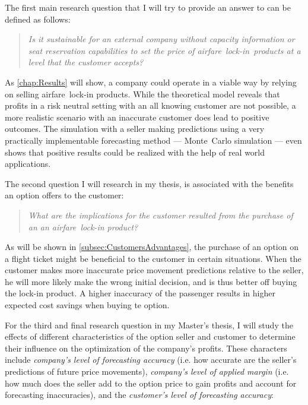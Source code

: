 The first main research question that I will try to provide an answer to can be defined as follows:

\begin{quote}\emph{Is it sustainable for an external company without capacity information or seat reservation capabilities to set the price of airfare~lock-in~products at a level that the customer accepts?}\end{quote}

As \autoref{chap:Results} will show, a company could operate in a viable way by relying on selling airfare~lock-in products. While the theoretical model reveals that profits in a risk neutral setting with an all knowing customer are not possible, a more realistic scenario with an inaccurate customer does lead to positive outcomes. The simulation with a seller making predictions using a very practically implementable forecasting method --- Monte~Carlo simulation --- even shows that positive results could be realized with the help of real world applications.

The second question I will research in my thesis, is associated with the benefits an option offers to the customer:

\begin{quote}\emph{What are the implications for the customer resulted from the purchase of an an airfare~lock-in product?}\end{quote}

As will be shown in \autoref{subsec:CustomersAdvantages}, the purchase of an option on a flight ticket might be beneficial to the customer in certain situations. When the customer makes more inaccurate price movement predictions relative to the seller, he will more likely make the wrong initial decision, and is thus better off buying the lock-in product. A higher inaccuracy of the passenger results in higher expected cost savings when buying te option.

For the third and final research question in my Master's thesis, I will study the effects of different characteristics of the option seller and customer to determine their influence on the optimization of the company's profits. These characters include \emph{company's level of forecasting accuracy} (i.e. how accurate are the seller's predictions of future price movements), \emph{company's level of applied margin} (i.e. how much does the seller add to the option price to gain profits and account for forecasting inaccuracies), and the \emph{customer's level of forecasting accuracy}:


